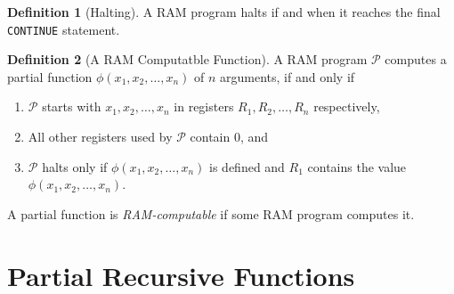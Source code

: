 \documentclass[11pt]{book}
\theoremstyle{definition}
\newtheorem{definition}{Definition}
\theoremstyle{plain}
\theoremstyle{problemstyle}
\theoremstyle{remark}
\theoremstyle{definition}
\begin{document}
\begin{definition}[Halting]
    \label{def:ram-program-halting}
    A RAM program halts if and when it reaches the final \texttt{CONTINUE} statement. 
\end{definition}
\begin{definition}[A RAM Computatble Function]
    \label{def:ram-computable-function}
    A RAM program $\mathcal{P}$ computes a partial function $\phi(x_1,x_2,\dots,x_n)$ of $n$ arguments, if and only if 
    \begin{enumerate}
        \item $\mathcal{P}$ starts with $x_1,x_2,\dots,x_n$ in registers $R_1,R_2,\dots,R_n$ respectively,
        \item All other registers used by $\mathcal{P}$ contain $0$, and
        \item $\mathcal{P}$ halts only if $\phi(x_1,x_2,\dots,x_n)$ is defined and $R_1$ contains the value $\phi(x_1,x_2,\dots,x_n)$. 
    \end{enumerate}

    A partial function is \emph{RAM-computable} if some RAM program computes it. 

\end{definition}
\section{Partial Recursive Functions}
\end{document}
